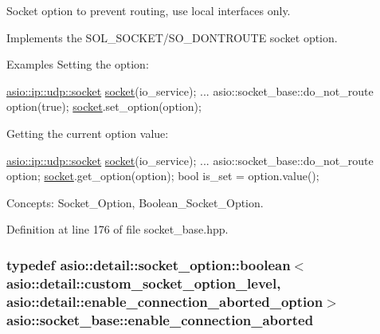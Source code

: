 Socket option to prevent routing, use local interfaces only. 

Implements the S\+O\+L\+\_\+\+S\+O\+C\+K\+E\+T/\+S\+O\+\_\+\+D\+O\+N\+T\+R\+O\+U\+T\+E socket option.

\begin{DoxyParagraph}{Examples}
Setting the option\+: 
\begin{DoxyCode}
\hyperlink{classasio_1_1basic__datagram__socket}{asio::ip::udp::socket} \hyperlink{namespacewebsocketpp_1_1transport_1_1asio_1_1socket_1_1error_a828ddaa5ed63a761e1b557465a35f05aa0c31b356014843e1d09514e794a539a7}{socket}(io\_service); 
...
asio::socket\_base::do\_not\_route option(\textcolor{keyword}{true});
\hyperlink{namespacewebsocketpp_1_1transport_1_1asio_1_1socket_1_1error_a828ddaa5ed63a761e1b557465a35f05aa0c31b356014843e1d09514e794a539a7}{socket}.set\_option(option);
\end{DoxyCode}

\end{DoxyParagraph}
\begin{DoxyParagraph}{}
Getting the current option value\+: 
\begin{DoxyCode}
\hyperlink{classasio_1_1basic__datagram__socket}{asio::ip::udp::socket} \hyperlink{namespacewebsocketpp_1_1transport_1_1asio_1_1socket_1_1error_a828ddaa5ed63a761e1b557465a35f05aa0c31b356014843e1d09514e794a539a7}{socket}(io\_service); 
...
asio::socket\_base::do\_not\_route option;
\hyperlink{namespacewebsocketpp_1_1transport_1_1asio_1_1socket_1_1error_a828ddaa5ed63a761e1b557465a35f05aa0c31b356014843e1d09514e794a539a7}{socket}.get\_option(option);
\textcolor{keywordtype}{bool} is\_set = option.value();
\end{DoxyCode}

\end{DoxyParagraph}
\begin{DoxyParagraph}{Concepts\+:}
Socket\+\_\+\+Option, Boolean\+\_\+\+Socket\+\_\+\+Option. 
\end{DoxyParagraph}


Definition at line 176 of file socket\+\_\+base.\+hpp.

\hypertarget{classasio_1_1socket__base_a9787312b9387d5bdc761f6b6d4530830}{}
\subsubsection[{enable\+\_\+connection\+\_\+aborted}]{\setlength{\rightskip}{0pt plus 5cm}typedef {\bf asio\+::detail\+::socket\+\_\+option\+::boolean}$<$ {\bf asio\+::detail\+::custom\+\_\+socket\+\_\+option\+\_\+level}, {\bf asio\+::detail\+::enable\+\_\+connection\+\_\+aborted\+\_\+option}$>$ {\bf asio\+::socket\+\_\+base\+::enable\+\_\+connection\+\_\+aborted}}\label{classasio_1_1socket__base_a9787312b9387d5bdc761f6b6d4530830}


